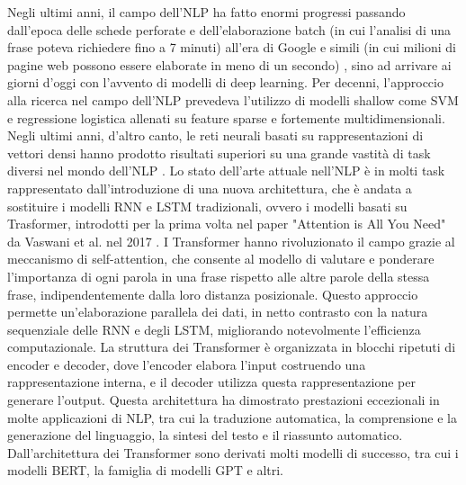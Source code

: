 \documentclass[../../Thesis.tex]{subfiles}
\begin{document}
Negli ultimi  anni, il campo dell'NLP ha fatto enormi progressi passando dall'epoca delle schede perforate e dell'elaborazione batch (in cui l'analisi di una frase poteva richiedere fino a 7 minuti) all'era di Google e simili (in cui milioni di pagine web possono essere elaborate in meno di un secondo) \cite{6786458}, sino ad arrivare ai giorni d'oggi con l'avvento di modelli di deep learning. Per decenni, l'approccio alla ricerca nel campo dell'NLP prevedeva l'utilizzo di modelli shallow come SVM \cite{SVM} e regressione logistica allenati su feature sparse e fortemente multidimensionali. Negli ultimi anni, d'altro canto,  le reti neurali basati su rappresentazioni di vettori densi hanno prodotto risultati superiori su una grande vastità di task diversi nel mondo dell'NLP \cite{TrendsInNLP}. 
Lo stato dell'arte attuale nell'NLP è in molti task rappresentato dall'introduzione di una nuova architettura, che è andata a sostituire i modelli RNN e LSTM \cite{LSTM} tradizionali, ovvero i modelli basati su Trasformer, introdotti per la prima volta nel paper "Attention is All You Need" da Vaswani et al. nel 2017 \cite{AttentionIsAllYouNeed}. I Transformer hanno rivoluzionato il campo grazie al meccanismo di self-attention, che consente al modello di valutare e ponderare l'importanza di ogni parola in una frase rispetto alle altre parole della stessa frase, indipendentemente dalla loro distanza posizionale. Questo approccio permette un'elaborazione parallela dei dati, in netto contrasto con la natura sequenziale delle RNN e degli LSTM, migliorando notevolmente l'efficienza computazionale. La struttura dei Transformer è organizzata in blocchi ripetuti di encoder e decoder, dove l'encoder elabora l'input costruendo una rappresentazione interna, e il decoder utilizza questa rappresentazione per generare l'output. Questa architettura ha dimostrato prestazioni eccezionali in molte applicazioni di NLP, tra cui la traduzione automatica, la comprensione e la generazione del linguaggio, la sintesi del testo e il riassunto automatico. Dall'architettura dei Transformer sono derivati molti modelli di successo, tra cui i modelli BERT, la famiglia di modelli GPT e altri. 
\end{document}
